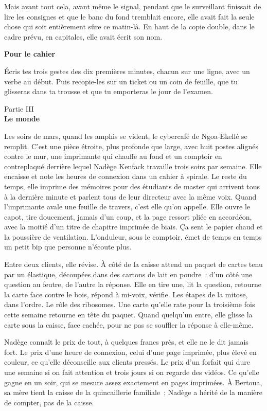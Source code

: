 \documentclass[10.5pt,twoside,openright]{book}
\newenvironment{pourcahier}[1]{\par\vspace{0.9em}\begin{tcolorbox}[colback=black!4,colframe=accent,boxrule=0pt,leftrule=2.2pt,arc=0pt,left=8pt,right=8pt,top=5pt,bottom=5pt]\small\textbf{#1}\par\smallskip}{\end{tcolorbox}\par}
\newcommand{\partie}[2]{\cleardoublepage\thispagestyle{empty}\vspace*{\fill}\begin{center}{\large\color{gris}Partie #2}\\[1.2em]{\Huge\bfseries #1}\end{center}\vspace*{\fill}\cleardoublepage\markboth{}{}}
\newcommand{\chapitre}[2]{\cleardoublepage\markright{#2}\thispagestyle{plain}\vspace*{2.2cm}{\noindent\color{accent}\fontsize{54}{54}\selectfont\bfseries #1}\par\vspace{0.5em}{\noindent\LARGE\bfseries #2\par}\vspace{1.6em}\noindent\ignorespaces}
\begin{document}
Mais avant tout cela, avant même le signal, pendant que le surveillant finissait de lire les consignes et que le banc du fond tremblait encore, elle avait fait la seule chose qui soit entièrement sûre ce matin-là. En haut de la copie double, dans le cadre prévu, en capitales, elle avait écrit son nom.

\begin{pourcahier}{Pour le cahier}
Écris tes trois gestes des dix premières minutes, chacun sur une ligne, avec un verbe au début. Puis recopie-les sur un ticket ou un coin de feuille, que tu glisseras dans ta trousse et que tu emporteras le jour de l’examen.
\end{pourcahier}


\partie{Le monde}{III}

\chapitre{11}{Ce qui ne dépend pas de toi}

Les soirs de mars, quand les amphis se vident, le cybercafé de Ngoa-Ekellé se remplit. C’est une pièce étroite, plus profonde que large, avec huit postes alignés contre le mur, une imprimante qui chauffe au fond et un comptoir en contreplaqué derrière lequel Nadège Kenfack travaille trois soirs par semaine. Elle encaisse et note les heures de connexion dans un cahier à spirale. Le reste du temps, elle imprime des mémoires pour des étudiants de master qui arrivent tous à la dernière minute et parlent tous de leur directeur avec la même voix. Quand l’imprimante avale une feuille de travers, c’est elle qu’on appelle. Elle ouvre le capot, tire doucement, jamais d’un coup, et la page ressort pliée en accordéon, avec la moitié d’un titre de chapitre imprimée de biais. Ça sent le papier chaud et la poussière de ventilation. L’onduleur, sous le comptoir, émet de temps en temps un petit bip que personne n’écoute plus.

Entre deux clients, elle révise. À côté de la caisse attend un paquet de cartes tenu par un élastique, découpées dans des cartons de lait en poudre : d’un côté une question au feutre, de l’autre la réponse. Elle en tire une, lit la question, retourne la carte face contre le bois, répond à mi-voix, vérifie. Les étapes de la mitose, dans l’ordre. Le rôle des ribosomes. Une carte qu’elle rate pour la troisième fois cette semaine retourne en tête du paquet. Quand quelqu’un entre, elle glisse la carte sous la caisse, face cachée, pour ne pas se souffler la réponse à elle-même.

Nadège connaît le prix de tout, à quelques francs près, et elle ne le dit jamais fort. Le prix d’une heure de connexion, celui d’une page imprimée, plus élevé en couleur, ce qu’elle déconseille aux clients pressés. Le prix d’un forfait qui dure une semaine si on fait attention et trois jours si on regarde des vidéos. Ce qu’elle gagne en un soir, qui se mesure assez exactement en pages imprimées. À Bertoua, sa mère tient la caisse de la quincaillerie familiale ; Nadège a hérité de la manière de compter, pas de la caisse.
\end{document}
